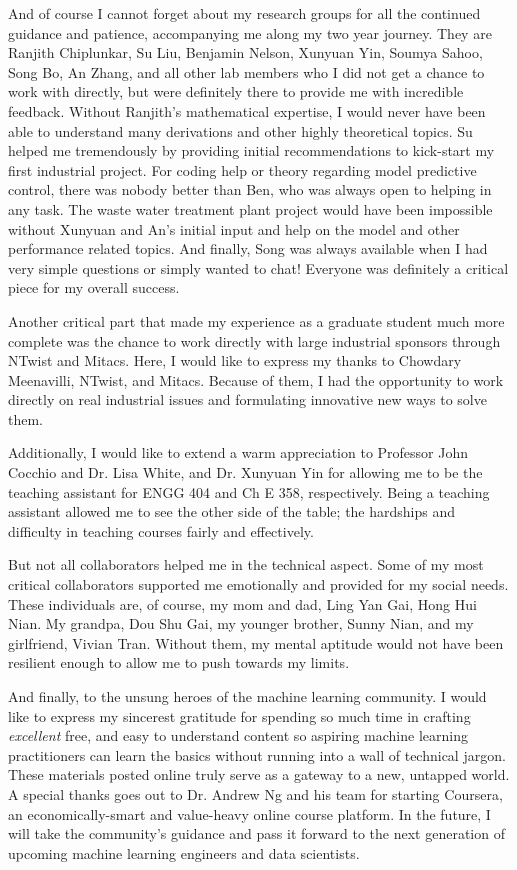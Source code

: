 \documentclass[12pt]{report}
\begin{document}
And of course I cannot forget about my research groups for all the continued guidance and patience, accompanying me along my two year journey.  They are Ranjith Chiplunkar, Su Liu, Benjamin Nelson, Xunyuan Yin, Soumya Sahoo, Song Bo, An Zhang, and all other lab members who I did not get a chance to work with directly, but were definitely there to provide me with incredible feedback.  Without Ranjith's mathematical expertise, I would never have been able to understand many derivations and other highly theoretical topics.  Su helped me tremendously by providing initial recommendations to kick-start my first industrial project.  For coding help or theory regarding model predictive control, there was nobody better than Ben, who was always open to helping in any task. The waste water treatment plant project would have been impossible without Xunyuan and An's initial input and help on the model and other performance related topics.  And finally, Song was always available when I had very simple questions or simply wanted to chat!  Everyone was definitely a critical piece for my overall success.  

Another critical part that made my experience as a graduate student much more complete was the chance to work directly with large industrial sponsors through NTwist and Mitacs.  Here, I would like to express my thanks to Chowdary Meenavilli, NTwist, and Mitacs.  Because of them, I had the opportunity to work directly on real industrial issues and formulating innovative new ways to solve them.

Additionally, I would like to extend a warm appreciation to Professor John Cocchio and Dr. Lisa White, and Dr. Xunyuan Yin for allowing me to be the teaching assistant for ENGG 404 and Ch E 358, respectively.  Being a teaching assistant allowed me to see the other side of the table; the hardships and difficulty in teaching courses fairly and effectively.

But not all collaborators helped me in the technical aspect.  Some of my most critical collaborators supported me emotionally and provided for my social needs.  These individuals are, of course, my mom and dad, Ling Yan Gai, Hong Hui Nian.  My grandpa, Dou Shu Gai, my younger brother, Sunny Nian, and my girlfriend, Vivian Tran.  Without them, my mental aptitude would not have been resilient enough to allow me to push towards my limits.

And finally, to the unsung heroes of the machine learning community.  I would like to express my sincerest gratitude for spending so much time in crafting \textit{excellent} free, and easy to understand content so aspiring machine learning practitioners can learn the basics without running into a wall of technical jargon.  These materials posted online truly serve as a gateway to a new, untapped world. A special thanks goes out to Dr. Andrew Ng and his team for starting Coursera, an economically-smart and value-heavy online course platform. In the future, I will take the community's guidance and pass it forward to the next generation of upcoming machine learning engineers and data scientists.
\end{document}
